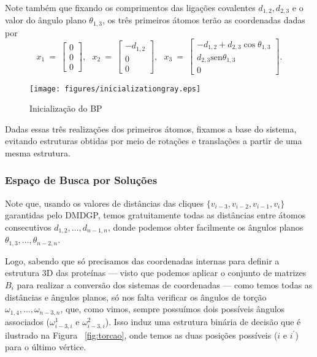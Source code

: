 Note também que fixando os comprimentos das ligações covalentes $d_{1,2},d_{2,3}$ e o valor do ângulo plano $\theta_{1,3}$, os três primeiros átomos terão as coordenadas dadas por
$$
x_1\:=\:
\begin{bmatrix}
	0\\ 
	0\\  
	0
\end{bmatrix},\:\:\:
x_2\:=\:
\begin{bmatrix}
	-d_{1,2}\\ 
	0\\  
	0
\end{bmatrix},\:\:\:
x_3\:=\:
\begin{bmatrix}
	-d_{1,2}+d_{2,3}\cos\theta_{1,3}\\ 
	d_{2,3}\mbox{sen}\theta_{1,3}\\  
	0
\end{bmatrix}.
$$

\begin{figure}[H]
	\begin{center}
		\texttt{[image: figures/inicializationgray.eps]}
	\end{center}
	\caption{Inicialização do BP}
	\label{fig:inicializacao}
\end{figure}


Dadas essas três realizações dos primeiros átomos, fixamos a base do sistema, evitando estruturas obtidas por meio de rotações e translações a partir de uma mesma estrutura.	

\subsubsection{Espaço de Busca por Soluções}
Note que, usando os valores de distâncias das cliques $\{ v_{i-3}, v_{i-2} , v_{i-1}, v_i \}$ garantidas pelo DMDGP, temos gratuitamente todas as distâncias entre átomos consecutivos $d_{1,2}, \dots, d_{n-1, n}$, donde podemos obter facilmente os ângulos planos $\theta_{1,3}, \dots, \theta_{n-2, n}$.

Logo, sabendo que só precisamos das coordenadas internas para definir a estrutura 3D das proteínas --- visto que podemos aplicar o conjunto de matrizes $B_i$ para realizar a conversão dos sistemas de coordenadas --- como temos todas as distâncias e ângulos planos, só nos falta verificar os ângulos de torção $\omega_{1,4}, \dots, \omega_{n-3, n}$, que, como vimos, sempre possuímos dois possíveis ângulos associados ($\omega_{i-3, i}^1$ e $\omega_{i-3,i}^2$). Isso induz uma estrutura binária de decisão que é ilustrado na Figura ~\ref{fig:torcao}, onde temos as duas posições possíveis ($i$ e $i^\prime$) para o último vértice.

